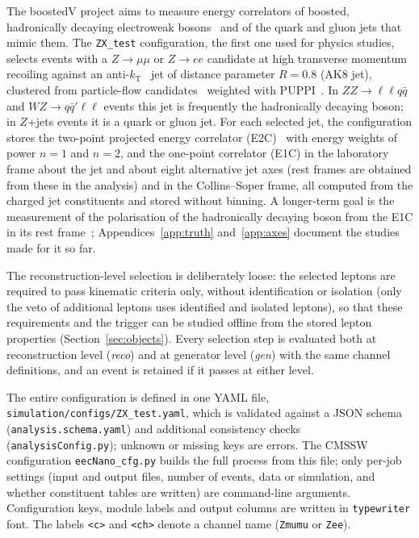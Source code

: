 \documentclass[11pt]{article}
\newcommand{\code}[1]{\texttt{#1}}
\begin{document}
The boostedV project aims to measure energy correlators of boosted, hadronically decaying electroweak
bosons~\cite{Ricci:2022htc} and of the quark and gluon jets that mimic them. The \code{ZX\_test} configuration, the first one used for physics studies, selects
events with a $Z\to\mu\mu$ or $Z\to ee$ candidate at high transverse momentum recoiling against an
anti-$k_\mathrm{T}$~\cite{Cacciari:2008gp,Cacciari:2011ma} jet of distance parameter $R = 0.8$ (AK8 jet), clustered
from particle-flow candidates~\cite{CMS:2017yfk} weighted with PUPPI~\cite{Bertolini:2014bba,CMS:2020ebo}. In $ZZ\to\ell\ell q\bar q$ and $WZ\to q\bar q'\ell\ell$ events this
jet is frequently the hadronically decaying boson; in $Z$+jets events it is a quark or gluon jet. For each selected jet,
the configuration stores the two-point projected energy correlator (E2C)~\cite{Chen:2020vvp} with energy weights of power
$n = 1$ and $n = 2$, and the one-point correlator (E1C) in the laboratory frame about the jet and about eight
alternative jet axes (rest frames are obtained from these in the analysis) and in the Collins--Soper frame, all computed from the charged jet constituents and stored without binning. A longer-term
goal is the measurement of the polarisation of the hadronically decaying boson from the E1C in its rest
frame~\cite{Gao:2026bvp}; Appendices~\ref{app:truth} and~\ref{app:axes} document the studies made for it so far.

The reconstruction-level selection is deliberately loose: the selected leptons are required to pass kinematic criteria
only, without identification or isolation (only the veto of additional leptons uses identified and isolated leptons), so that these requirements and the trigger can be studied offline from the stored lepton
properties (Section~\ref{sec:objects}). Every selection step is evaluated both at reconstruction level (\emph{reco})
and at generator level (\emph{gen}) with the same channel definitions, and an event is retained if it passes at either
level.

The entire configuration is defined in one YAML file, \code{simulation/configs/ZX\_test.yaml}, which is validated
against a JSON schema (\code{analysis.schema.yaml}) and additional consistency checks (\code{analysisConfig.py});
unknown or missing keys are errors. The CMSSW configuration \code{eecNano\_cfg.py} builds the full process from this
file; only per-job settings (input and output files, number of events, data or simulation, and whether constituent
tables are written) are command-line arguments. Configuration keys, module labels and output columns are written in
\code{typewriter} font. The labels \code{<c>} and \code{<ch>} denote a channel name (\code{Zmumu} or \code{Zee}).
\end{document}
